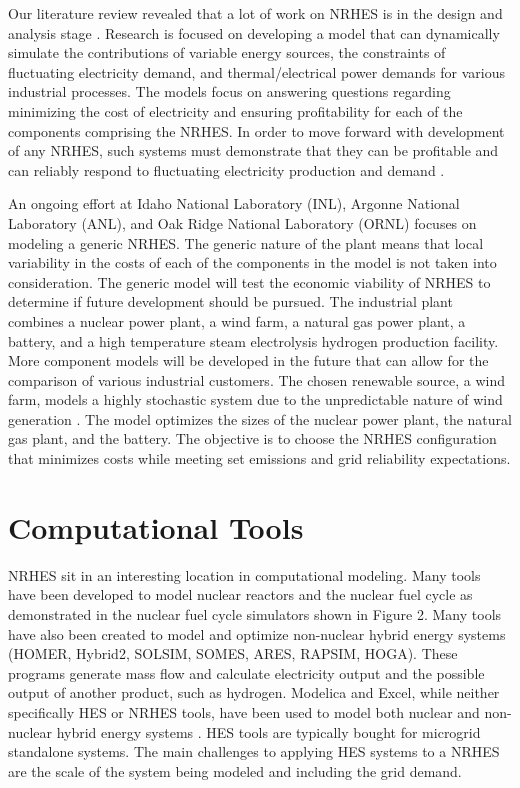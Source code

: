 \documentclass[12pt]{UIdahoMastersThesis}
\begin{document}
Our literature review revealed that a lot of work on NRHES is in the design and analysis stage \cite{Boardman2013, Shropshire2012}. Research is focused on developing a model that can dynamically simulate the contributions of variable energy sources, the constraints of fluctuating electricity demand, and thermal/electrical power demands for various industrial processes. The models focus on answering questions regarding minimizing the cost of electricity and ensuring profitability for each of the components comprising the NRHES. In order to move forward with development of any NRHES,  such systems must demonstrate that they can be profitable and can reliably respond to fluctuating electricity production and demand \cite{Rabiti2015}. 

An ongoing effort at Idaho National Laboratory (INL), Argonne National Laboratory (ANL), and Oak Ridge National Laboratory (ORNL) focuses on modeling a generic NRHES. The generic nature of the plant means that local variability in the costs of each of the components in the model is not taken into consideration. The generic model will test the economic viability of NRHES to determine if future development should be pursued. The industrial plant combines a nuclear power plant, a wind farm, a natural gas power plant, a battery, and a high temperature steam electrolysis hydrogen production facility. More component models will be developed in the future that can allow for the comparison of various industrial customers\cite{Harrison2016}. The chosen renewable source, a wind farm, models a highly stochastic system due to the unpredictable nature of wind generation \cite{Chen2016_wind}. The model optimizes the sizes of the nuclear power plant, the natural gas plant, and the battery. The objective is to choose the NRHES configuration that minimizes costs while meeting set emissions and grid reliability expectations.

\section{Computational Tools}
NRHES sit in an interesting location in computational modeling. Many tools have been developed to model nuclear reactors and the nuclear fuel cycle as demonstrated in the nuclear fuel cycle simulators shown in Figure 2. Many tools have also been created to model and optimize non-nuclear hybrid energy systems (HOMER, Hybrid2, SOLSIM, SOMES, ARES, RAPSIM, HOGA)\cite {Bernal-Agustin2009}. These programs generate mass flow and calculate electricity output and the possible output of another product, such as hydrogen. Modelica and Excel, while neither specifically HES or NRHES tools, have been used to model both nuclear and non-nuclear hybrid energy systems \cite{Shropshire2012, Chen2016, Binder2014, Garcia2015, Epiney2016}. HES tools are typically bought for microgrid standalone systems. The main challenges to applying HES systems to a NRHES are the scale of the system being modeled and including the grid demand.
\end{document}
